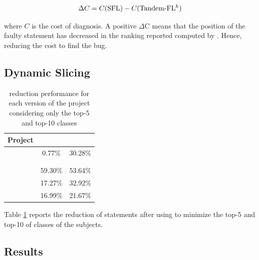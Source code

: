\documentclass{article}
\begin{document}
\begin{equation}
    \Delta{}C = C(\textrm{SFL}) - C(\textrm{Tandem-FL$^{k}$})
\end{equation}

\noindent
where $C$ is the cost of diagnosis. 
A positive $\Delta$C means that the position of the faulty statement has decreased
in the ranking reported computed by . Hence, reducing the cost to
find the bug.

\subsection{Dynamic Slicing}


\begin{table}[h]
	\centering
	\setlength{\tabcolsep}{4pt}
	\begin{tabular}{lcc}
		\toprule
		Project             &  \combpar{k}  & \combpar{10} \\
		\midrule

        \lang{}            & 0.77\% & 30.28\%\\
        \cmath{}           &  & \\
        \closure{}          &  & \\
		\chart{}			& 59.30\% & 53.64\% \\
        \jtime{}            & 17.27\% & 32.92\%\\
        \mockito{}          & 16.99\% & 21.67\%\\

		\bottomrule
	\end{tabular}
	\caption {\ds{} reduction performance for each version of the \chart{} project considering only the top-5 and top-10 classes}
	\label{tab:red}
\end{table}
\normalsize

Table \ref{tab:red} reports the reduction of statements after using \ds{} to minimize the top-5 and top-10 of classes of the subjects.


\subsection{Results}
\end{document}
